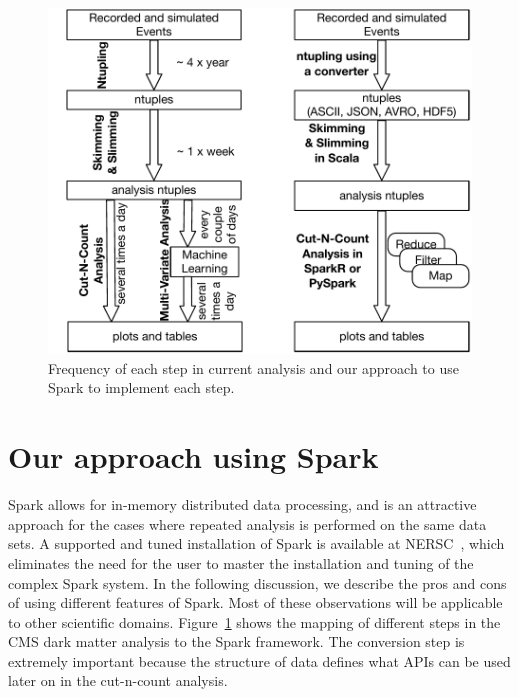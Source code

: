 \documentclass[11pt, twocolumn]{article}
\newcommand{\squeezeup}{\vspace{-5.5mm}}
\begin{document}
\squeezeup
\begin{figure}[htbp]
\begin{center}
 \includegraphics[scale=0.5]{flow}
\caption{Frequency of each step in current analysis and our approach to 
use Spark to implement each step. }
\label{fig:flow}
\end{center}
\end{figure}

%

\section{Our approach using Spark}
\squeezeup
Spark allows for in-memory distributed data processing, and is an attractive
approach for the cases where repeated analysis is performed on the
same data sets. A supported and tuned installation of Spark is
available at NERSC~\cite{nersc-spark}, which eliminates the need for 
the user to master the installation and tuning of the complex Spark system.
In the following discussion, we describe the pros and cons of using 
different features of Spark. Most of these observations will be applicable 
to other scientific domains. Figure~\ref{fig:flow} shows the mapping of 
different steps in the CMS dark matter analysis to the Spark framework. The conversion 
step is extremely important because the structure of data defines 
what APIs can be used later on in the cut-n-count analysis. 
\end{document}
